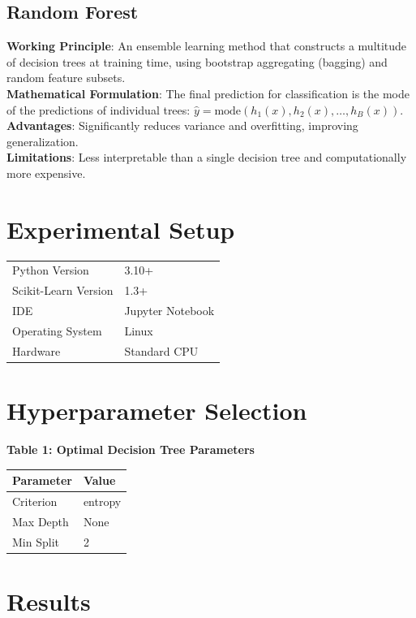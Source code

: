 \documentclass[12pt,a4paper]{article}
\begin{document}
\subsection*{Random Forest}
\textbf{Working Principle}: An ensemble learning method that constructs a multitude of decision trees at training time, using bootstrap aggregating (bagging) and random feature subsets.\\
\textbf{Mathematical Formulation}: The final prediction for classification is the mode of the predictions of individual trees: $\hat{y} = \text{mode}(h_1(x), h_2(x), \dots, h_B(x))$.\\
\textbf{Advantages}: Significantly reduces variance and overfitting, improving generalization.\\
\textbf{Limitations}: Less interpretable than a single decision tree and computationally more expensive.

\section{Experimental Setup}
\begin{tabular}{ll}
\toprule
Python Version & 3.10+ \\
Scikit-Learn Version & 1.3+ \\
IDE & Jupyter Notebook \\
Operating System & Linux \\
Hardware & Standard CPU \\
\bottomrule
\end{tabular}

\section{Hyperparameter Selection}

\textbf{Table 1: Optimal Decision Tree Parameters}\\
\begin{tabular}{ll}\toprule
Parameter & Value\\ \midrule
Criterion & entropy \\
Max Depth & None \\
Min Split & 2 \\ \bottomrule
\end{tabular}



\section{Results}
\end{document}
